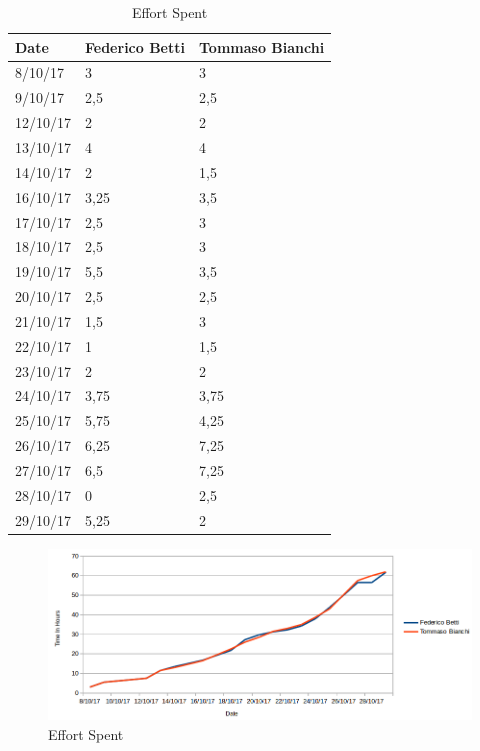 \begin{table}[H]	
	\centering
	\def\arraystretch{1.25}
	\begin{tabular}{|m{5cm}|m{5cm}|m{5cm}|}
		\hline
		\textbf{Date} & \textbf{Federico Betti} & \textbf{Tommaso Bianchi} \\ \hline
		8/10/17 &	3 &	3 \\ \hline
		9/10/17 &	2,5 &	2,5\\ \hline
		12/10/17 &	2 &	2\\ \hline
		13/10/17 &	4 &	4\\ \hline
		14/10/17 &	2 &	1,5\\ \hline
		16/10/17 &	3,25 &	3,5\\ \hline
		17/10/17 &	2,5 &	3\\ \hline
		18/10/17 &	2,5 &	3\\ \hline
		19/10/17 &	5,5 &	3,5\\ \hline
		20/10/17 &	2,5 &	2,5\\ \hline
		21/10/17 &	1,5 &	3\\ \hline
		22/10/17 &	1 &	1,5\\ \hline
		23/10/17 &	2 &	2\\ \hline
		24/10/17 &	3,75 &	3,75\\ \hline
		25/10/17 &	5,75 &	4,25\\ \hline
		26/10/17 &	6,25 &	7,25\\ \hline
		27/10/17 &	6,5 &	7,25\\ \hline
		28/10/17 &	0 &	2,5\\ \hline
		29/10/17 &	5,25 &	2\\ \hline		
	\end{tabular}
	\caption{Effort Spent}
\end{table}

\begin{figure}[H]
	\centering\includegraphics[width=\textwidth]{EffortSpent/effortSpentGraph.png}
	\caption{Effort Spent}
\end{figure}